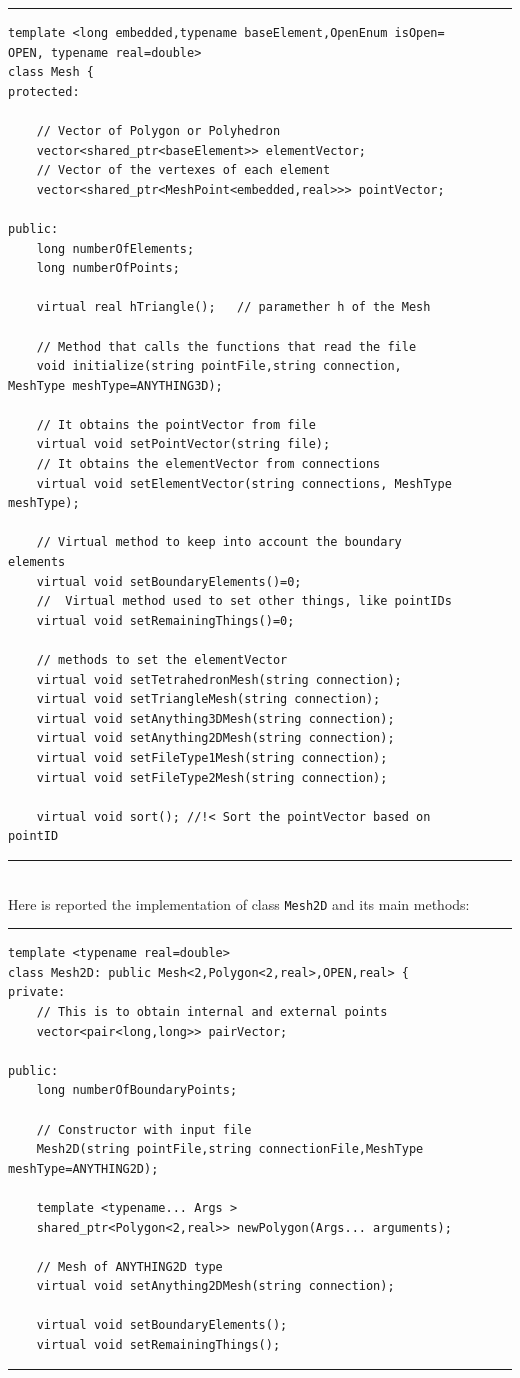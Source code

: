 \noindent\rule{12.7cm}{1pt}
\begin{verbatim}
template <long embedded,typename baseElement,OpenEnum isOpen=
OPEN, typename real=double>
class Mesh {
protected:
    
    // Vector of Polygon or Polyhedron
    vector<shared_ptr<baseElement>> elementVector;	
    // Vector of the vertexes of each element
    vector<shared_ptr<MeshPoint<embedded,real>>> pointVector;	
	
public:
    long numberOfElements;
    long numberOfPoints;

    virtual real hTriangle();	// paramether h of the Mesh
	
    // Method that calls the functions that read the file
    void initialize(string pointFile,string connection,
MeshType meshType=ANYTHING3D);

    // It obtains the pointVector from file
    virtual void setPointVector(string file);	
    // It obtains the elementVector from connections
    virtual void setElementVector(string connections, MeshType
meshType);
    
    // Virtual method to keep into account the boundary 
elements
    virtual void setBoundaryElements()=0;
    //	Virtual method used to set other things, like pointIDs
    virtual void setRemainingThings()=0;

    // methods to set the elementVector
    virtual void setTetrahedronMesh(string connection); 
    virtual void setTriangleMesh(string connection);	
    virtual void setAnything3DMesh(string connection);
    virtual void setAnything2DMesh(string connection);
    virtual void setFileType1Mesh(string connection);
    virtual void setFileType2Mesh(string connection);

    virtual void sort(); //!< Sort the pointVector based on 
pointID
\end{verbatim}

\noindent\rule{12.7cm}{1pt}\\

Here is reported the implementation of class \verb|Mesh2D| and its main methods:

\noindent\rule{12.7cm}{1pt}
\begin{verbatim}
template <typename real=double>
class Mesh2D: public Mesh<2,Polygon<2,real>,OPEN,real> {
private:
    // This is to obtain internal and external points	
    vector<pair<long,long>> pairVector;

public:
    long numberOfBoundaryPoints;
	
    // Constructor with input file
    Mesh2D(string pointFile,string connectionFile,MeshType 
meshType=ANYTHING2D);

    template <typename... Args >
    shared_ptr<Polygon<2,real>> newPolygon(Args... arguments);

    // Mesh of ANYTHING2D type
    virtual void setAnything2DMesh(string connection);

    virtual void setBoundaryElements();
    virtual void setRemainingThings();
\end{verbatim}
\noindent\rule{12.7cm}{1pt}\\

